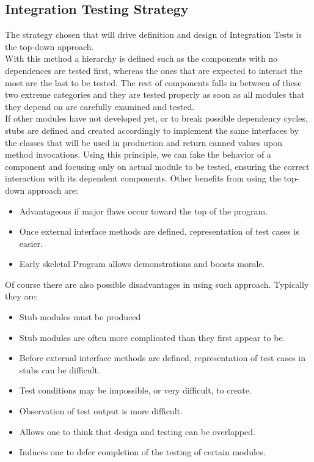 \subsection{Integration Testing Strategy}
The strategy chosen that will drive definition and design of Integration Tests is the top-down approach. \\
With this method a hierarchy is defined such as the components with no dependences are tested first, whereas the ones that are expected to interact the most are the last to be tested. The rest of components falls in between of these two extreme categories and they are tested properly as soon as all modules that they depend on are carefully examined and tested. \\
If other modules have not developed yet, or to break possible dependency cycles, stubs are defined and created accordingly to implement the same interfaces by the classes that will be used in production and return canned values upon method invocations. Using this principle, we can fake the behavior of a component and focusing only on actual module to be tested, ensuring the correct interaction with its dependent components.
Other benefits from using the top-down approach are:
\begin{itemize}
	\item Advantageous if major flaws occur toward the top of the program.
	\item Once external interface methods are defined, representation of test cases is easier.
	\item Early skeletal Program allows demonstrations and boosts morale.
\end{itemize}
Of course there are also possible disadvantages in using such approach. Typically they are:
\begin{itemize}
	\item Stub modules must be produced
	\item Stub modules are often more complicated than they first appear to be.
	\item Before external interface methods are defined, representation of test cases in stubs can be difficult.
	\item Test conditions may be impossible, or very difficult, to create.
	\item Observation of test output is more difficult.
	\item Allows one to think that design and testing can be overlapped.
	\item Induces one to defer completion of the testing of certain modules.
\end{itemize}
\break
